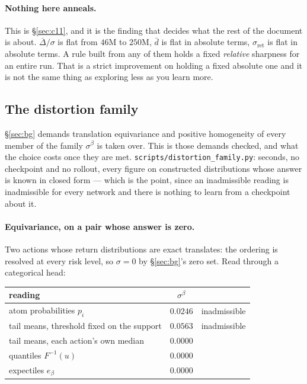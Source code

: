 \documentclass{article}
\newcommand{\gapbar}{\overline{\Delta}}
\newcommand{\dbar}{\bar{d}}
\newcommand{\sret}{\sigma_{\mathrm{ret}}}
\newcommand{\srank}{\sigma}
\newcommand{\srankb}{\sigma^{\beta}}
\begin{document}
\paragraph{Nothing here anneals.} This is \S\ref{sec:c11}, and it is the finding that decides
what the rest of the document is about. $\gapbar/\srank$ is flat from $46$M to $250$M, $\dbar$ is
flat in absolute terms, $\sret$ is flat in absolute terms. A rule built from any of them holds a
fixed \emph{relative} sharpness for an entire run. That is a strict improvement on holding a
fixed absolute one and it is not the same thing as exploring less as you learn more.


\subsection{The distortion family}
\label{sec:meas-family}

\S\ref{sec:bg} demands translation equivariance and positive homogeneity of every member of the
family $\srankb$ is taken over. This is those demands checked, and what the choice costs once
they are met. \texttt{scripts/distortion\_family.py}: seconds, no checkpoint and no rollout, every
figure on constructed distributions whose answer is known in closed form --- which is the point,
since an inadmissible reading is inadmissible for every network and there is nothing to learn
from a checkpoint about it.

\paragraph{Equivariance, on a pair whose answer is zero.} Two actions whose return distributions
are exact translates: the ordering is resolved at every risk level, so $\srank = 0$ by
\S\ref{sec:bg}'s zero set. Read through a categorical head:

\begin{center}
\small
\begin{tabular}{lcc}
  \toprule
  reading & $\srankb$ & \\
  \midrule
  atom probabilities $p_i$          & $0.0246$ & inadmissible \\
  tail means, threshold fixed on the support & $0.0563$ & inadmissible \\
  tail means, each action's own median & $0.0000$ & \\
  quantiles $F^{-1}(u)$             & $0.0000$ & \\
  expectiles $e_\beta$              & $0.0000$ & \\
  \bottomrule
\end{tabular}
\end{center}
\end{document}
